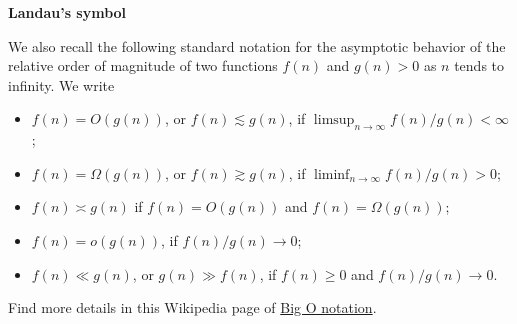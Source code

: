 \documentclass[19pt,landscape]{article}
\begin{document}
\newpage
{\LARGE\centerline{\textbf{Landau's symbol}}}
\vskip25pt
\begin{minipage}{.9\textwidth}
   \Large
   We also recall the following standard notation for the asymptotic behavior of the relative order of magnitude of two functions $f(n)$ and $g(n )>0$ as $n$ tends to infinity.
   We write
   \begin{itemize}
      \item
        $f(n)=O(g(n))$,
        or $f(n ) \lesssim g(n )$, if $\limsup_{n \to\infty} f(n ) / g(n ) <\infty$;
      \item
        $f(n)=\Omega(g(n ))$, or 
        $f(n ) \gtrsim g(n )$, if $\liminf_{n \to\infty} f(n) / g(n)>0$;
      \item $f(n)\asymp g(n)$ if $f(n)=O(g(n))$ and $f(n)=\Omega(g(n))$; %
     \item $f(n)=o(g(n))$, if $f(n)/g(n)\to 0$;
      \item $f(n)\ll g(n)$, or $g(n)\gg f(n)$, if $f(n)\ge0$ and $f(n)/g(n)\to 0$.
  \end{itemize}
  Find more details in this Wikipedia page of \href{https://en.wikipedia.org/wiki/Big_O_notation#History_(Bachmann–Landau,_Hardy,_and_Vinogradov_notations)}{Big O notation}.
\end{minipage}







\newpage



    
    
\end{document}
